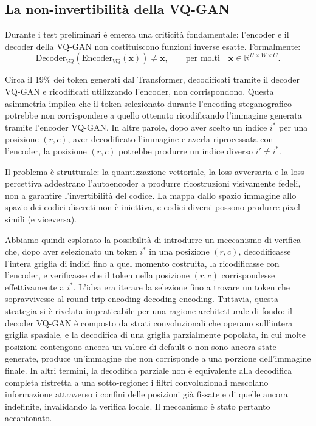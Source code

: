 \subsection{La non-invertibilità della VQ-GAN}\label{sec:non-invertibilita}

Durante i test preliminari è emersa una criticità fondamentale: l'encoder e il decoder della VQ-GAN non costituiscono funzioni inverse esatte. Formalmente:
\[
	\mathrm{Decoder}_{VQ}(\mathrm{Encoder}_{VQ}(\mathbf{x})) \ne \mathbf{x}, \qquad \text{per molti} \quad \mathbf{x} \in \mathbb{R}^{H \times W \times C}.
\]


Circa il 19\% dei token generati dal Transformer, decodificati tramite il decoder VQ-GAN e ricodificati utilizzando l'encoder, non corrispondono. Questa asimmetria implica che il token selezionato durante l'encoding steganografico potrebbe non corrispondere a quello ottenuto ricodificando l'immagine generata tramite l'encoder VQ-GAN. In altre parole, dopo aver scelto un indice $i^*$ per una posizione $(r, c)$, aver decodificato l'immagine e averla riprocessata con l'encoder, la posizione $(r, c)$ potrebbe produrre un indice diverso $i' \ne i^*$.

Il problema è strutturale: la quantizzazione vettoriale, la loss avversaria e la loss percettiva addestrano l'autoencoder a produrre ricostruzioni visivamente fedeli, non a garantire l'invertibilità del codice. La mappa dallo spazio immagine allo spazio dei codici discreti non è iniettiva, e codici diversi possono produrre pixel simili (e viceversa).

Abbiamo quindi esplorato la possibilità di introdurre un meccanismo di verifica che, dopo aver selezionato un token $i^*$ in una posizione $(r,c)$, decodificasse l'intera griglia di indici fino a quel momento costruita, la ricodificasse con l'encoder, e verificasse che il token nella posizione $(r,c)$ corrispondesse effettivamente a $i^*$. L'idea era iterare la selezione fino a trovare un token che sopravvivesse al round-trip encoding-decoding-encoding. Tuttavia, questa strategia si è rivelata impraticabile per una ragione architetturale di fondo: il decoder VQ-GAN è composto da strati convoluzionali che operano sull'intera griglia spaziale, e la decodifica di una griglia parzialmente popolata, in cui molte posizioni contengono ancora un valore di default o non sono ancora state generate, produce un'immagine che non corrisponde a una porzione dell'immagine finale. In altri termini, la decodifica parziale non è equivalente alla decodifica completa ristretta a una sotto-regione: i filtri convoluzionali mescolano informazione attraverso i confini delle posizioni già fissate e di quelle ancora indefinite, invalidando la verifica locale. Il meccanismo è stato pertanto accantonato.

